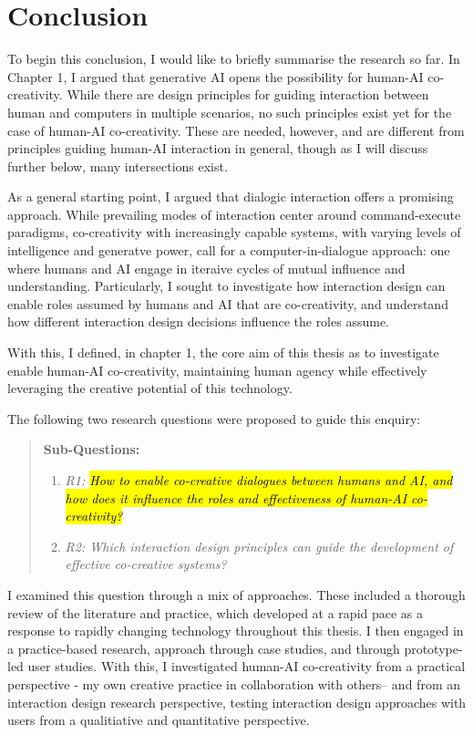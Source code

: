 \chapter[Conclusion]{Conclusion}\label{c:conclusion}

To begin this conclusion, I would like to briefly summarise the research so far. In Chapter 1, I argued that generative AI opens the possibility for human-AI co-creativity. While there are design principles for guiding interaction between human and computers in multiple scenarios, no such principles exist yet for the case of human-AI co-creativity. These are needed, however, and are different from principles guiding human-AI interaction in general, though as I will discuss further below, many intersections exist. 

As a general starting point, I argued that dialogic interaction offers a promising approach. While prevailing modes of interaction center around command-execute paradigms, co-creativity with increasingly capable systems, with varying levels of intelligence and generatve power, call for a computer-in-dialogue approach: one where humans and AI engage in iteraive cycles of mutual influence and understanding. Particularly, I sought to investigate how interaction design can enable roles assumed by humans and AI that are co-creativity, and understand how different interaction design decisions influence the roles assume. 

With this, I defined, in chapter 1, the core aim of this thesis as to investigate enable human-AI co-creativity, maintaining human agency while effectively leveraging the creative potential of this technology.

The following two research questions were proposed to guide this enquiry:

\begin{quote}
\textbf{Sub-Questions:}
\begin{enumerate}
    \item \emph{R1: \hl{How to enable co-creative dialogues between humans and AI, and how does it influence the roles and effectiveness of human-AI co-creativity?}}
    \item \emph{R2: Which interaction design principles can guide the development of effective co-creative systems?}
\end{enumerate}
\end{quote}

I examined this question through a mix of approaches. These included a thorough review of the literature and practice, which developed at a rapid pace as a response to rapidly changing technology throughout this thesis. I then engaged in a practice-based research, approach through case studies, and through prototype-led user studies. With this, I investigated human-AI co-creativity from a practical perspective - my own creative practice in collaboration with others-- and from an interaction design research perspective, testing interaction design approaches with users from a qualitiative and quantitative perspective. 

